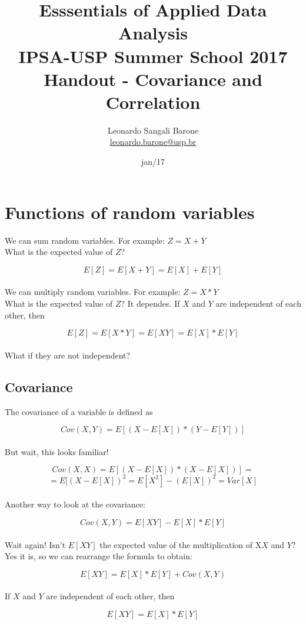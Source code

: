\documentclass[11pt]{article}
\title{\textbf{Esssentials of Applied Data Analysis\\
				IPSA-USP Summer School 2017}\newline\\
				Handout - Covariance and Correlation}
\author{Leonardo Sangali Barone\\ \href{leonardo.barone@usp.br}{leonardo.barone@usp.br}}
\date{jan/17}
\begin{document}
\maketitle

\section*{Functions of random variables}

	We can sum random variables. For example: $Z=X+Y$\\

	What is the expected value of $Z$?

	\[E[Z] = E[X+Y] = E[X] + E[Y]\]\\

	We can multiply random variables. For example: $Z=X*Y$\\
	
	What is the expected value of $Z$? It dependes. If $X$ and $Y$ are independent of each other, then	

	\[E[Z] = E[X*Y] =E[XY] = E[X] * E[Y]\]\\

	What if they are not independent?

	\subsection*{Covariance}
	
	The covariance of a variable is defined as
	
	\[Cov(X,Y) = E[(X-E[X]) * (Y-E[Y])]\]\\
	
	But wait, this looks familiar!
	
	\[Cov(X,X) = E[(X-E[X]) * (X-E[X])] = \]
	\[= E[(X-E[X])^2 = E[X^2] - (E[X])^2 = Var[X]\]\\

	Another way to look at the covariance:
	
	\[Cov(X,Y) = E[XY] - E[X]*E[Y]\]\\

	Wait again! Isn't $E[XY]$ the expected value of the multiplication of X$X$ and $Y$? Yes it is, so we can rearrange the formula to obtain:

	\[E[XY] = E[X]*E[Y] + Cov(X,Y)\]\\

	If $X$ and $Y$ are independent of each other, then 

	\[E[XY] = E[X]*E[Y]\]\\
\end{document}
